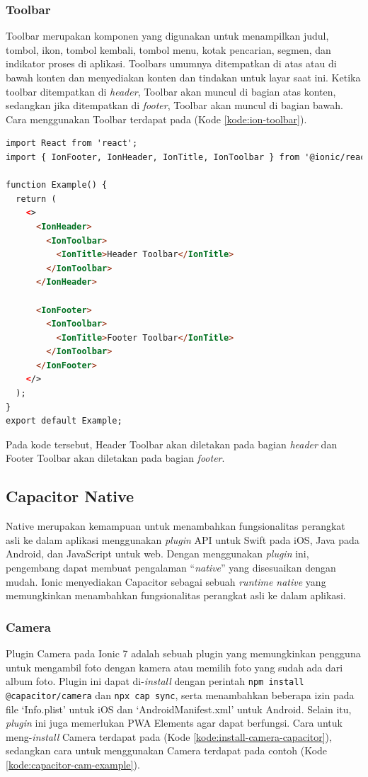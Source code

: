 \subsubsection{Toolbar}
Toolbar merupakan komponen yang digunakan untuk menampilkan judul, tombol, ikon, tombol kembali, tombol menu, kotak pencarian, segmen, dan indikator proses di aplikasi. Toolbars umumnya ditempatkan di atas atau di bawah konten dan menyediakan konten dan tindakan untuk layar saat ini. Ketika toolbar ditempatkan di \textit{header}, Toolbar akan muncul di bagian atas konten, sedangkan jika ditempatkan di \textit{footer}, Toolbar akan muncul di bagian bawah. Cara menggunakan Toolbar terdapat pada (Kode \ref{kode:ion-toolbar}).

\begin{lstlisting}[language=HTML, caption=Contoh Kode Penggunaan Toolbar, label=kode:ion-toolbar]
import React from 'react';
import { IonFooter, IonHeader, IonTitle, IonToolbar } from '@ionic/react';

function Example() {
  return (
    <>
      <IonHeader>
        <IonToolbar>
          <IonTitle>Header Toolbar</IonTitle>
        </IonToolbar>
      </IonHeader>

      <IonFooter>
        <IonToolbar>
          <IonTitle>Footer Toolbar</IonTitle>
        </IonToolbar>
      </IonFooter>
    </>
  );
}
export default Example;
\end{lstlisting}

Pada kode tersebut, Header Toolbar akan diletakan pada bagian \textit{header} dan Footer Toolbar akan diletakan pada bagian \textit{footer}. 

\subsection{Capacitor Native}
Native merupakan kemampuan untuk menambahkan fungsionalitas perangkat asli ke dalam aplikasi menggunakan \textit{plugin} API untuk Swift pada iOS, Java pada Android, dan JavaScript untuk web. Dengan menggunakan \textit{plugin} ini, pengembang dapat membuat pengalaman ``\textit{native}'' yang disesuaikan dengan mudah. Ionic menyediakan Capacitor sebagai sebuah \textit{runtime native} yang memungkinkan menambahkan fungsionalitas perangkat asli ke dalam aplikasi.

\subsubsection{Camera}
Plugin Camera pada Ionic 7 adalah sebuah plugin yang memungkinkan pengguna untuk mengambil foto dengan kamera atau memilih foto yang sudah ada dari album foto. Plugin ini dapat di-\textit{install} dengan perintah \texttt{npm install @capacitor/camera}  dan \texttt{npx cap sync}, serta menambahkan beberapa izin pada file `Info.plist' untuk iOS dan `AndroidManifest.xml' untuk Android. Selain itu, \textit{plugin} ini juga memerlukan PWA Elements agar dapat berfungsi. Cara untuk meng-\textit{install} Camera terdapat pada (Kode \ref{kode:install-camera-capacitor}), sedangkan cara untuk menggunakan Camera terdapat pada contoh (Kode \ref{kode:capacitor-cam-example}).

